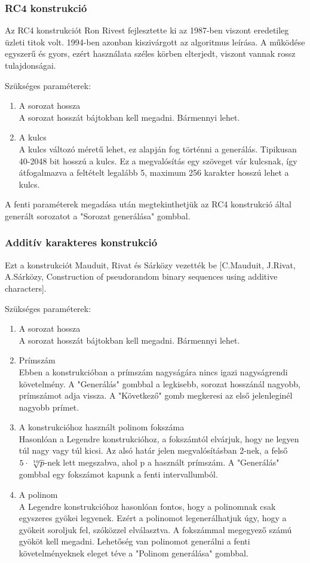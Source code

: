 \documentclass[12pt]{article}
\begin{document}
	\subsubsection{RC4 konstrukció}
	Az RC4 konstrukciót Ron Rivest fejlesztette ki az 1987-ben viszont eredetileg üzleti titok volt. 1994-ben azonban kiszivárgott az algoritmus leírása. A működése egyszerű és gyors, ezért használata széles körben elterjedt, viszont vannak rossz tulajdonságai.
	\par
	Szükséges paraméterek:
	\begin{enumerate}
		\bfseries\item A sorozat hossza \\
		\normalfont A sorozat hosszát bájtokban kell megadni. Bármennyi lehet.
		\bfseries \item A kulcs
		\\
		\normalfont A kulcs változó méretű lehet, ez alapján fog történni a generálás. Tipikusan 40-2048 bit hosszú a kulcs. Ez a megvalósítás egy szöveget vár kulcsnak, így átfogalmazva a feltételt legalább 5, maximum 256 karakter hosszú lehet a kulcs.
	\end{enumerate}
	A fenti paraméterek megadása után megtekinthetjük az RC4 konstrukció által generált sorozatot a "Sorozat generálása" gombbal.
	\subsubsection{Additív karakteres konstrukció}
	Ezt a konstrukciót Mauduit, Rivat és Sárközy vezették be  [C.Mauduit, J.Rivat, A.Sárközy, Construction of pseudorandom binary sequences using additive characters]. \par
	Szükséges paraméterek:
	\begin{enumerate}
		\bfseries \item A sorozat hossza \\
		\normalfont A sorozat hosszát bájtokban kell megadni. Bármennyi lehet. \\
		\bfseries \item Prímszám \\
		\normalfont Ebben a konstrukcióban a prímszám nagyságára nincs igazi nagyságrendi követelmény. A "Generálás" gombbal a legkisebb, sorozat hosszánál nagyobb, prímszámot adja vissza. A "Következő" gomb megkeresi az első jelenleginél nagyobb prímet.
		\bfseries \item A konstrukcióhoz használt polinom fokszáma \\
		\normalfont Hasonlóan a Legendre konstrukcióhoz, a fokszámtól elvárjuk, hogy ne legyen túl nagy vagy túl kicsi. Az alsó határ jelen megvalósításban 2-nek, a felső $5\cdot\sqrt[\leftroot{-2}\uproot{2}10]{p}$-nek lett megszabva, ahol p a használt prímszám. A "Generálás" gombbal egy fokszámot kapunk a fenti intervallumból.
		\bfseries \item A polinom \\
		\normalfont A Legendre konstrukcióhoz hasonlóan fontos, hogy a polinomnak csak egyszeres gyökei legyenek. Ezért a polinomot legenerálhatjuk úgy, hogy a gyökeit soroljuk fel, szóközzel elválasztva. A fokszámmal megegyező számú gyököt kell megadni. Lehetőség van polinomot generálni a fenti követelményeknek eleget téve a "Polinom generálása" gombbal.
	\end{enumerate}
\end{document}
